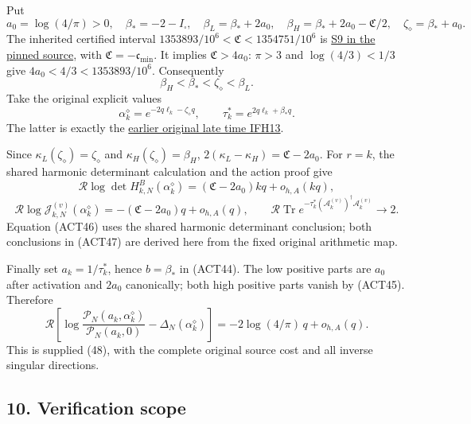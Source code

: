 \documentclass[11pt]{article}
\begin{document}
Put \[
a_0=\log(4/\pi)>0,\quad \beta_*=-2-I_\square,\quad
\beta_L=\beta_*+2a_0,\quad
\beta_H=\beta_*+2a_0-\mathfrak C/2,\quad
\zeta_\diamond=\beta_*+a_0.
\] The inherited certified interval \(1353893/10^6<\mathfrak C<1354751/10^6\) is \href{https://github.com/KokunoYumeto/zeta-function-research-reader/blob/edd4008690952fb8568a01744e49ad7e180401e9/workbenches/splitzero-tandem/continuations/20260921-original-observation/NATIVE_SMALLEST_SINGULAR_PROOF.tex\#L55}{S9 in the pinned source}, with \(\mathfrak C=-\mathfrak c_{\min}\). It implies \(\mathfrak C>4a_0\): \(\pi>3\) and \(\log(4/3)<1/3\) give \(4a_0<4/3<1353893/10^6\). Consequently \[
\beta_H<\beta_*<\zeta_\diamond<\beta_L.
\tag{ACT45}
\] Take the original explicit values \[
\alpha_k^\diamond=e^{-2q\ell_k-\zeta_\diamond q},\qquad
\tau_k^*=e^{2q\ell_k+\beta_*q}.
\] The latter is exactly the \href{https://github.com/KokunoYumeto/zeta-function-research-reader/blob/edd4008690952fb8568a01744e49ad7e180401e9/workbenches/splitzero-tandem/continuations/20260921-original-observation/INVERSE_FLAG_AND_RELATIVE_HEAT.tex\#L261}{earlier original late time IFH13}.

Since \(\kappa_L(\zeta_\diamond)=\zeta_\diamond\) and \(\kappa_H(\zeta_\diamond)=\beta_H\), \(2(\kappa_L-\kappa_H)=\mathfrak C-2a_0\). For \(r=k\), the shared harmonic determinant calculation and the action proof give \[
\mathcal R\log\det H^B_{k,N}(\alpha_k^\diamond)
=(\mathfrak C-2a_0)kq+o_{h,A}(kq),
\tag{ACT46}
\] \[
\mathcal R\log\mathscr J_{k,N}^{(v)}(\alpha_k^\diamond)
=-(\mathfrak C-2a_0)q+o_{h,A}(q),\qquad
\mathcal R\operatorname{Tr}e^{-\tau_k^*(\mathscr A_k^{(v)})^\dagger
\mathscr A_k^{(v)}}\to2.
\tag{ACT47}
\] Equation (ACT46) uses the shared harmonic determinant conclusion; both conclusions in (ACT47) are derived here from the fixed original arithmetic map.

Finally set \(a_k=1/\tau_k^*\), hence \(b=\beta_*\) in (ACT44). The low positive parts are \(a_0\) after activation and \(2a_0\) canonically; both high positive parts vanish by (ACT45). Therefore \[
\boxed{\mathcal R\left[
\log\frac{\mathscr P_N(a_k,\alpha_k^\diamond)}{\mathscr P_N(a_k,0)}
-\Delta_N(\alpha_k^\diamond)\right]
=-2\log(4/\pi)\,q+o_{h,A}(q).}
\tag{ACT48}
\] This is supplied (48), with the complete original source cost and all inverse singular directions.

\subsection{10. Verification scope}\label{verification-scope}
\end{document}
